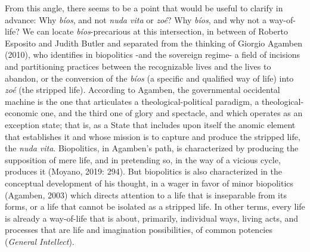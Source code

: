 \documentclass[a4paper,]{scrartcl}
\begin{document}
From this angle, there seems to be a point that would be useful to
clarify in advance: Why \emph{bíos}, and not \emph{nuda vita} or
\emph{zoé}? Why \emph{bíos}, and why not a way-of-life? We can locate
\emph{bíos}-precarious at this intersection, in between of Roberto
Esposito and Judith Butler and separated from the thinking of Giorgio
Agamben (2010), who identifies in biopolitics -and the sovereign regime-
a field of incisions and partitioning practices between the recognizable
lives and the lives to abandon, or the conversion of the \emph{bíos} (a
specific and qualified way of life) into \emph{zoé} (the stripped life).
According to Agamben, the governmental occidental machine is the one
that articulates a theological-political paradigm, a
theological-economic one, and the third one of glory and spectacle, and
which operates as an exception state; that is, as a State that includes
upon itself the anomic element that establishes it and whose mission is
to capture and produce the stripped life, the \emph{nuda vita}.
Biopolitics, in Agamben's path, is characterized by producing the
supposition of mere life, and in pretending so, in the way of a vicious
cycle, produces it (Moyano, 2019: 294). But biopolitics is also
characterized in the conceptual development of his thought, in a wager
in favor of minor biopolitics (Agamben, 2003) which directs attention to
a life that is inseparable from its forms, or a life that cannot be
isolated as a stripped life. In other terms, every life is already a
way-of-life that is about, primarily, individual ways, living acts, and
processes that are life and imagination possibilities, of common
potencies (\emph{General Intellect}).
\end{document}
